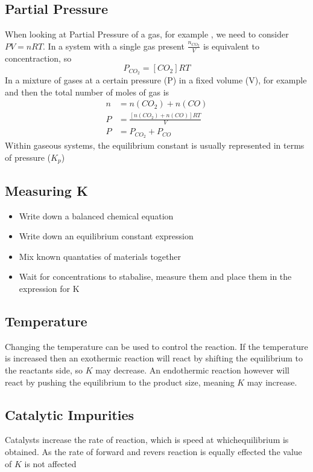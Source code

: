\documentclass[a4paper, 12pt]{article}
\begin{document}
	\subsection{Partial Pressure}
		When looking at Partial Pressure of a gas, for example , we need to consider $PV=nRT$. In a system with a single gas present $\frac{n_{CO_2}}{V}$ is equivalent to concentraction, so 
		\[ P_{CO_2} = [CO_2] RT \]
		In a mixture of gases at a certain pressure (P) in a fixed volume (V), for example  and  then the total number of moles of gas is
		\begin{align*}
			n &= n(CO_2) + n(CO) \\
			P &= \frac{[n(CO_2) + n(CO)] RT}{V} \\
			P &= P_{CO_2} + P_{CO}
		\end{align*}
		Within gaseous systems, the equilibrium constant is usually represented in terms of pressure ($K_p$)
		
	\subsection{Measuring K}
		\begin{itemize}
			\item Write down a balanced chemical equation
			\item Write down an equilibrium constant expression
			\item Mix known quantaties of materials together
			\item Wait for concentrations to stabalise, measure them and place them in the expression for K
		\end{itemize}
		
	\subsection{Temperature}
		Changing the temperature can be used to control the reaction. If the temperature is increased then an exothermic reaction will react by shifting the equilibrium to the reactants side, so $K$ may decrease. An endothermic reaction however will react by pushing the equilibrium to the product size, meaning $K$ may increase.
		
	\subsection{Catalytic Impurities} 
		Catalysts increase the rate of reaction, which is speed at whichequilibrium is obtained. As the rate of forward and revers reaction is equally effected the value of $K$ is not affected
		
\end{document}
